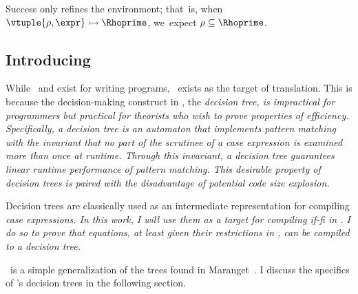 \documentclass[manuscript,screen,review, 12pt, nonacm]{acmart}
\begin{document}
    \medskip
        
    Success only refines the environment; that~is, when ${\vtuple{\rho, \expr}}
    \rightarrowtail{} {\Rhoprime}$, we~expect $\rho \subseteq \Rhoprime$.
    
    \vfilbreak

\vmsemantics

\subsection{Introducing \D}
\label{d}

While \PPlus\ and \VMinus exist for writing programs, \D\ exists as the target
of translation. This is because the decision-making construct in \D, the
\it{decision tree}, is impractical for programmers but practical for theorists
who wish to prove properties of efficiency. Specifically, a decision tree is an
automaton that implements pattern matching with the invariant that no part of
the scrutinee of a \it{case} expression is examined more than once at runtime.
Through this invariant, a decision tree guarantees linear runtime performance of
pattern matching. This desirable property of decision trees is paired with the
disadvantage of potential code size explosion. 

Decision trees are classically used as an intermediate representation for
compiling \it{case} expressions. In this work, I will use them as a target for
compiling \it{if-fi} in \VMinus. I do so to prove that equations, at least given
their restrictions in \VMinus, can be compiled to a decision tree. 

\D\ is a simple generalization of the trees found in Maranget~\citep{maranget}. I
discuss the specifics of \D's decision trees in the following section. 
\end{document}

